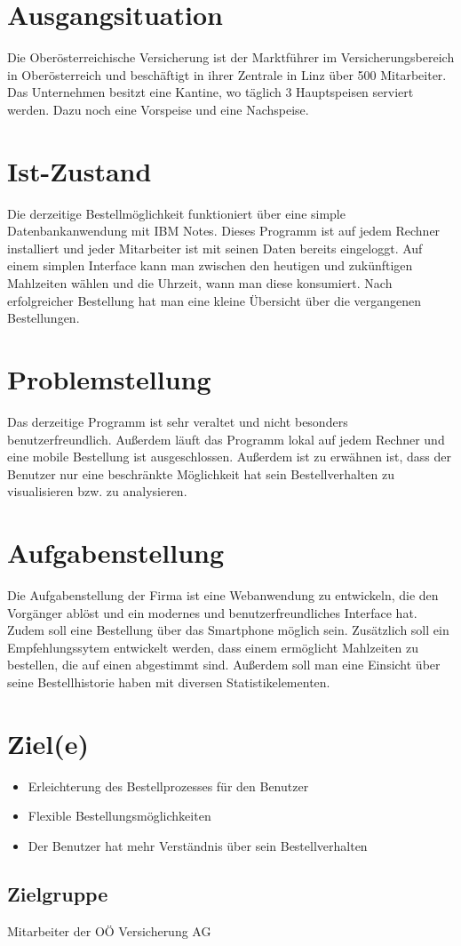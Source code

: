 \section{Ausgangsituation}
Die Oberösterreichische Versicherung ist der Marktführer im Versicherungsbereich in Oberösterreich 
und beschäftigt in ihrer Zentrale in Linz über 500 Mitarbeiter.
Das Unternehmen besitzt eine Kantine, wo täglich 3 Hauptspeisen serviert werden. Dazu noch
eine Vorspeise und eine Nachspeise. 
\section{Ist-Zustand}
Die derzeitige Bestellmöglichkeit funktioniert über eine simple Datenbankanwendung mit IBM Notes.
Dieses Programm ist auf jedem Rechner installiert und jeder Mitarbeiter ist mit seinen Daten bereits eingeloggt.
Auf einem simplen Interface kann man zwischen den heutigen und zukünftigen Mahlzeiten wählen und die Uhrzeit, wann man 
diese konsumiert. Nach erfolgreicher Bestellung hat man eine kleine Übersicht über die vergangenen Bestellungen.
\section{Problemstellung}
Das derzeitige Programm ist sehr veraltet und nicht besonders benutzerfreundlich. Außerdem
läuft das Programm lokal auf jedem Rechner und eine mobile Bestellung ist ausgeschlossen.
Außerdem ist zu erwähnen ist, dass der Benutzer nur eine beschränkte Möglichkeit hat sein Bestellverhalten 
zu visualisieren bzw. zu analysieren.
\section{Aufgabenstellung}
Die Aufgabenstellung der Firma ist eine Webanwendung zu entwickeln, die den Vorgänger ablöst
und ein modernes und benutzerfreundliches Interface hat. Zudem soll eine Bestellung über das Smartphone
möglich sein. Zusätzlich soll ein Empfehlungssytem entwickelt werden, dass einem ermöglicht Mahlzeiten zu 
bestellen, die auf einen abgestimmt sind. Außerdem soll man eine Einsicht über seine Bestellhistorie haben
mit diversen Statistikelementen.
\section{Ziel(e)}
\begin{itemize}
    \item Erleichterung des Bestellprozesses für den Benutzer
    \item Flexible Bestellungsmöglichkeiten
    \item Der Benutzer hat mehr Verständnis über sein Bestellverhalten
\end{itemize}

\subsection{Zielgruppe}
Mitarbeiter der OÖ Versicherung AG
